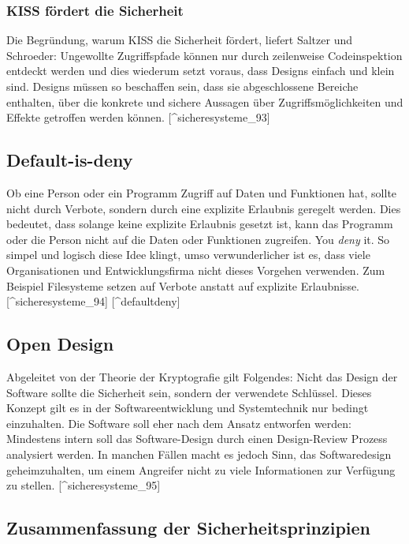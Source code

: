 \subsubsection{KISS fördert die
Sicherheit}\label{kiss-fuxf6rdert-die-sicherheit}

Die Begründung, warum KISS die Sicherheit fördert, liefert Saltzer und
Schroeder: Ungewollte Zugriffspfade können nur durch zeilenweise
Codeinspektion entdeckt werden und dies wiederum setzt voraus, dass
Designs einfach und klein sind. Designs müssen so beschaffen sein, dass
sie abgeschlossene Bereiche enthalten, über die konkrete und sichere
Aussagen über Zugriffsmöglichkeiten und Effekte getroffen werden können.
{[}\^{}sicheresysteme\_93{]}

\subsection{Default-is-deny}\label{default-is-deny}

Ob eine Person oder ein Programm Zugriff auf Daten und Funktionen hat,
sollte nicht durch Verbote, sondern durch eine explizite Erlaubnis
geregelt werden. Dies bedeutet, dass solange keine explizite Erlaubnis
gesetzt ist, kann das Programm oder die Person nicht auf die Daten oder
Funktionen zugreifen. You \emph{deny} it. So simpel und logisch diese
Idee klingt, umso verwunderlicher ist es, dass viele Organisationen und
Entwicklungsfirma nicht dieses Vorgehen verwenden. Zum Beispiel
Filesysteme setzen auf Verbote anstatt auf explizite
Erlaubnisse.{[}\^{}sicheresysteme\_94{]} {[}\^{}defaultdeny{]}

\subsection{Open Design}\label{open-design}

Abgeleitet von der Theorie der Kryptografie gilt Folgendes: Nicht das
Design der Software sollte die Sicherheit sein, sondern der verwendete
Schlüssel. Dieses Konzept gilt es in der Softwareentwicklung und
Systemtechnik nur bedingt einzuhalten. Die Software soll eher nach dem
Ansatz entworfen werden: Mindestens intern soll das Software-Design
durch einen Design-Review Prozess analysiert werden. In manchen Fällen
macht es jedoch Sinn, das Softwaredesign geheimzuhalten, um einem
Angreifer nicht zu viele Informationen zur Verfügung zu stellen.
{[}\^{}sicheresysteme\_95{]}

\subsection{Zusammenfassung der
Sicherheitsprinzipien}\label{zusammenfassung-der-sicherheitsprinzipien}

